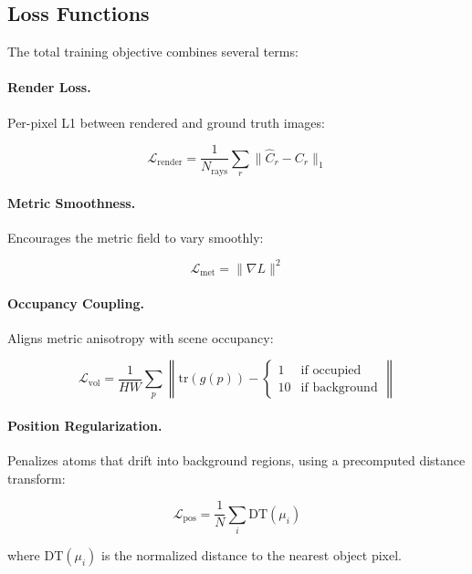 \documentclass[11pt]{article}
\begin{document}
\subsection{Loss Functions}

The total training objective combines several terms:

\paragraph{Render Loss.} Per-pixel L1 between rendered and ground truth images:

\begin{equation}
    \mathcal{L}_{\text{render}} = \frac{1}{N_{\text{rays}}} \sum_{r} \|\hat{C}_r - C_r\|_1
\end{equation}

\paragraph{Metric Smoothness.} Encourages the metric field to vary smoothly:

\begin{equation}
    \mathcal{L}_{\text{met}} = \|\nabla L\|^2
\end{equation}

\paragraph{Occupancy Coupling.} Aligns metric anisotropy with scene occupancy:

\begin{equation}
    \mathcal{L}_{\text{vol}} = \frac{1}{HW} \sum_{p} \left\| \text{tr}(g(p)) - \begin{cases} 1 & \text{if occupied} \\ 10 & \text{if background} \end{cases} \right\|
\end{equation}

\paragraph{Position Regularization.} Penalizes atoms that drift into background regions, using a precomputed distance transform:

\begin{equation}
    \mathcal{L}_{\text{pos}} = \frac{1}{N} \sum_i \text{DT}(\mu_i)
\end{equation}

where $\text{DT}(\mu_i)$ is the normalized distance to the nearest object pixel.
\end{document}
